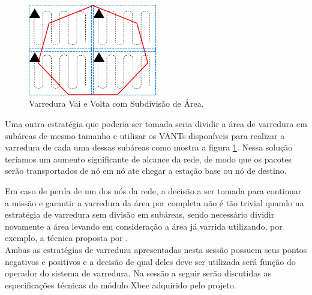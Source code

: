 \begin{figure} 
\center
\includegraphics[width=0.5\textwidth]{comsubdivisao.png}
\caption{Varredura Vai e Volta com Subdivisão de Área.} 
\label{fig:comsubdivisao}
\end{figure}

Uma outra estratégia que poderia ser tomada seria dividir a área de varredura em subáreas de mesmo tamanho e utilizar os VANTs disponíveis para realizar a varredura de cada uma dessas subáreas como mostra a figura \ref{fig:comsubdivisao}. Nessa solução teríamos um aumento significante de alcance da rede, de modo que os pacotes serão transportados de nó em nó ate chegar a estação base ou nó de destino.

Em caso de perda de um dos nós da rede, a decisão a ser tomada para continuar a missão e garantir a varredura da área por completa não é tão trivial quando na estratégia de varredura sem divisão em subáreas, sendo necessário dividir novamente a área levando em consideração a área já varrida utilizando, por exemplo, a técnica proposta por \cite{marro2013path}.\\

Ambas as estratégias de varredura apresentadas nesta sessão possuem seus pontos negativos e positivos e a decisão de qual deles deve ser utilizada será função do operador do sistema de varredura. Na sessão a seguir serão discutidas as especificações técnicas do módulo Xbee adquirido pelo projeto.





